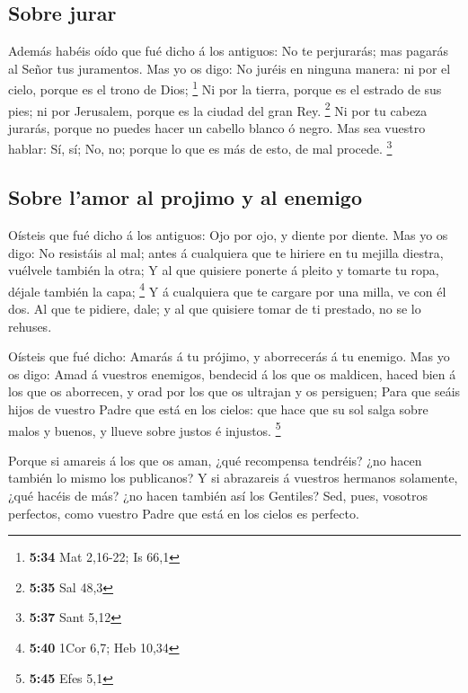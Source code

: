 \hypertarget{sobre-jurar}{%
\subsection{Sobre jurar}\label{sobre-jurar}}

 Además habéis oído que fué dicho á los antiguos: No te
perjurarás; mas pagarás al Señor tus juramentos.  Mas yo os
digo: No juréis en ninguna manera: ni por el cielo, porque es el trono
de Dios; \footnote{\textbf{5:34} Mat 2,16-22; Is 66,1}  Ni
por la tierra, porque es el estrado de sus pies; ni por Jerusalem,
porque es la ciudad del gran Rey. \footnote{\textbf{5:35} Sal 48,3}
 Ni por tu cabeza jurarás, porque no puedes hacer un
cabello blanco ó negro.  Mas sea vuestro hablar: Sí, sí;
No, no; porque lo que es más de esto, de mal procede. \footnote{\textbf{5:37}
  Sant 5,12}

\hypertarget{sobre-lamor-al-projimo-y-al-enemigo}{%
\subsection{Sobre l'amor al projimo y al
enemigo}\label{sobre-lamor-al-projimo-y-al-enemigo}}

 Oísteis que fué dicho á los antiguos: Ojo por ojo, y
diente por diente.  Mas yo os digo: No resistáis al mal;
antes á cualquiera que te hiriere en tu mejilla diestra, vuélvele
también la otra;  Y al que quisiere ponerte á pleito y
tomarte tu ropa, déjale también la capa; \footnote{\textbf{5:40} 1Cor
  6,7; Heb 10,34}  Y á cualquiera que te cargare por una
milla, ve con él dos.  Al que te pidiere, dale; y al que
quisiere tomar de ti prestado, no se lo rehuses.

 Oísteis que fué dicho: Amarás á tu prójimo, y aborrecerás
á tu enemigo.  Mas yo os digo: Amad á vuestros enemigos,
bendecid á los que os maldicen, haced bien á los que os aborrecen, y
orad por los que os ultrajan y os persiguen;  Para que
seáis hijos de vuestro Padre que está en los cielos: que hace que su sol
salga sobre malos y buenos, y llueve sobre justos é injustos.
\footnote{\textbf{5:45} Efes 5,1}

 Porque si amareis á los que os aman, ¿qué recompensa
tendréis? ¿no hacen también lo mismo los publicanos?  Y si
abrazareis á vuestros hermanos solamente, ¿qué hacéis de más? ¿no hacen
también así los Gentiles?  Sed, pues, vosotros perfectos,
como vuestro Padre que está en los cielos es perfecto.

